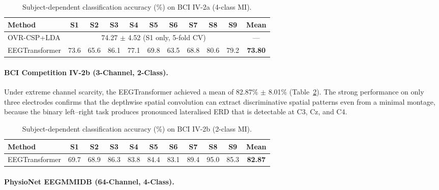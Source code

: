 \documentclass[12pt, a4paper]{article}
\begin{document}
\begin{table}[htbp]
\centering
\caption{Subject-dependent classification accuracy (\%) on BCI IV-2a (4-class MI).}
\label{tab:iv2a_results}
\begin{tabular}{lcccccccccc}
\toprule
\textbf{Method} & \textbf{S1} & \textbf{S2} & \textbf{S3} & \textbf{S4} & \textbf{S5} & \textbf{S6} & \textbf{S7} & \textbf{S8} & \textbf{S9} & \textbf{Mean} \\
\midrule
OVR-CSP+LDA & \multicolumn{9}{c}{74.27 $\pm$ 4.52 (S1 only, 5-fold CV)} & --- \\
EEGTransformer & 73.6 & 65.6 & 86.1 & 77.1 & 69.8 & 63.5 & 68.8 & 80.6 & 79.2 & \textbf{73.80} \\
\bottomrule
\end{tabular}
\end{table}

\paragraph{BCI Competition IV-2b (3-Channel, 2-Class).}

Under extreme channel scarcity, the EEGTransformer achieved a mean of 82.87\% $\pm$ 8.01\% (Table~\ref{tab:iv2b_results}). The strong performance on only three electrodes confirms that the depthwise spatial convolution can extract discriminative spatial patterns even from a minimal montage, because the binary left--right task produces pronounced lateralised ERD that is detectable at C3, Cz, and C4.

\begin{table}[htbp]
\centering
\caption{Subject-dependent classification accuracy (\%) on BCI IV-2b (2-class MI).}
\label{tab:iv2b_results}
\begin{tabular}{lcccccccccc}
\toprule
\textbf{Method} & \textbf{S1} & \textbf{S2} & \textbf{S3} & \textbf{S4} & \textbf{S5} & \textbf{S6} & \textbf{S7} & \textbf{S8} & \textbf{S9} & \textbf{Mean} \\
\midrule
EEGTransformer & 69.7 & 68.9 & 86.3 & 83.8 & 84.4 & 83.1 & 89.4 & 95.0 & 85.3 & \textbf{82.87} \\
\bottomrule
\end{tabular}
\end{table}

\paragraph{PhysioNet EEGMMIDB (64-Channel, 4-Class).}
\end{document}
